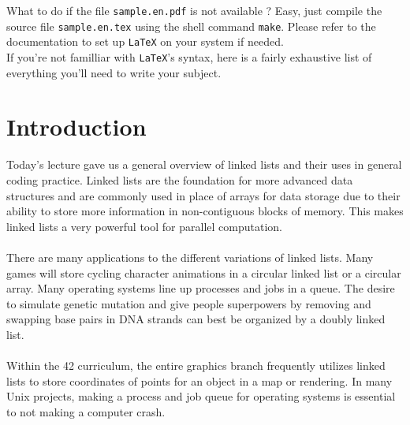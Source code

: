\documentclass{42-en}
\begin{document}
    What to do if the file \texttt{sample.en.pdf} is not available ?
    Easy, just compile the source file \texttt{sample.en.tex} using
    the shell command \texttt{make}. Please refer to the documentation
    to set up \texttt{LaTeX} on your system if needed.\\

    If you're not familliar with \texttt{LaTeX}'s syntax, here is a
    fairly exhaustive list of everything you'll need to write your
    subject.\\

\chapter{Introduction}
    Today's lecture gave us a general overview of linked lists and their
    uses in general coding practice. Linked lists are the foundation for
    more advanced data structures and are commonly used in place of arrays
    for data storage due to their ability to store more information in
    non-contiguous blocks of memory. This makes linked lists a very powerful
    tool for parallel computation.
    \\
    \\
    There are many applications to the different variations of linked lists.
    Many games will store cycling character animations in a circular linked
    list or a circular array. Many operating systems line up processes and 
    jobs in a queue. The desire to simulate genetic mutation and give people
    superpowers by removing and swapping base pairs in DNA strands can best
    be organized by a doubly linked list.
    \\
    \\
    Within the 42 curriculum, the entire graphics branch frequently utilizes
    linked lists to store coordinates of points for an object in a map or
    rendering. In many Unix projects, making a process and job queue for
    operating systems is essential to not making a computer crash.



\end{document}

